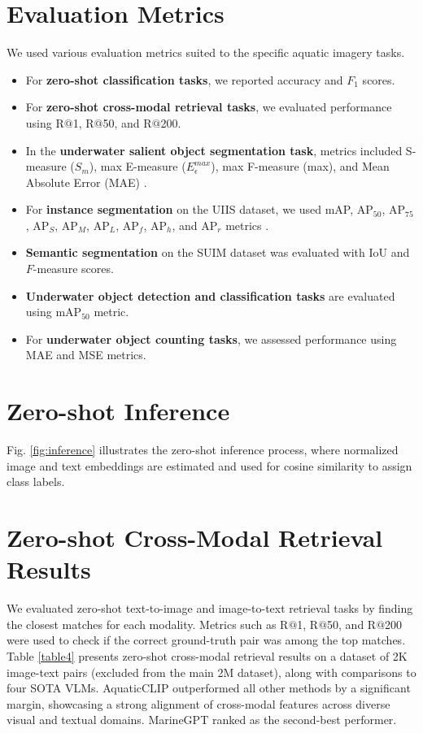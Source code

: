 \section{Evaluation Metrics}
\label{metrics}
We used various evaluation metrics suited to the specific aquatic imagery tasks. 

\begin{itemize}
    \item For \textbf{zero-shot classification tasks}, we reported accuracy and $F_{1}$ scores.
    \item For \textbf{zero-shot cross-modal retrieval tasks}, we evaluated performance using R$@$1, R$@$50, and R$@$200.
    \item In the \textbf{underwater salient object segmentation task}, metrics included S-measure ($S_{m}$), max E-measure ($E_{\epsilon}^{max}$), max F-measure (max), and Mean Absolute Error (MAE) \cite{usod10k}.
    \item For \textbf{instance segmentation} on the UIIS dataset, we used mAP, $\textrm{AP}_{50}$, $\textrm{AP}_{75}$, $\textrm{AP}_{S}$, $\textrm{AP}_{M}$,  $\textrm{AP}_{L}$, $\textrm{AP}_{f}$, $\textrm{AP}_{h}$, and $\textrm{AP}_{r}$ metrics \cite{Lian_2023_ICCV}.
    \item \textbf{Semantic segmentation} on the SUIM dataset was evaluated with IoU and $F$-measure scores.
    \item \textbf{Underwater object detection and classification tasks} are evaluated using mAP$_{50}$ metric.
    \item For \textbf{underwater object counting tasks}, we assessed performance using MAE and MSE metrics.
\end{itemize}
    

\section{Zero-shot Inference}
\label{inference}
Fig. \ref{fig:inference} illustrates the zero-shot inference process, where normalized image and text embeddings are estimated and used for cosine similarity to assign class labels.

\section{Zero-shot Cross-Modal Retrieval Results}
\label{cross}
We evaluated zero-shot text-to-image and image-to-text retrieval tasks by finding the closest matches for each modality. 
Metrics such as R$@$1, R$@$50, and R$@$200 were used to check if the correct ground-truth pair was among the top matches. 
Table \ref{table4} presents zero-shot cross-modal retrieval results on a dataset of 2K image-text pairs (excluded from the main 2M dataset), along with comparisons to four SOTA VLMs. 
AquaticCLIP outperformed all other methods by a significant margin, showcasing a strong alignment of cross-modal features across diverse visual and textual domains. 
MarineGPT ranked as the second-best performer.


